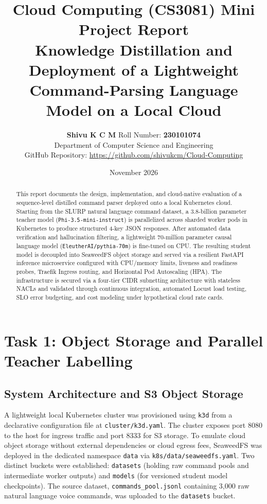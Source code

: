 \documentclass[10pt,a4paper]{article}
\title{\textbf{Cloud Computing (CS3081) Mini Project Report}\\
\large Knowledge Distillation and Deployment of a Lightweight Command-Parsing Language Model on a Local Cloud}
\author{\textbf{Shivu K C M} \quad Roll Number: \textbf{230101074}\\
Department of Computer Science and Engineering\\
GitHub Repository: \url{https://github.com/shivukcm/Cloud-Computing}}
\date{November 2026}
\begin{document}
\maketitle
\thispagestyle{fancy}

\begin{abstract}
This report documents the design, implementation, and cloud-native evaluation of a sequence-level distilled command parser deployed onto a local Kubernetes cloud. Starting from the SLURP natural language command dataset, a 3.8-billion parameter teacher model (\texttt{Phi-3.5-mini-instruct}) is parallelized across sharded worker pods in Kubernetes to produce structured 4-key JSON responses. After automated data verification and hallucination filtering, a lightweight 70-million parameter causal language model (\texttt{EleutherAI/pythia-70m}) is fine-tuned on CPU. The resulting student model is decoupled into SeaweedFS object storage and served via a resilient FastAPI inference microservice configured with CPU/memory limits, liveness and readiness probes, Traefik Ingress routing, and Horizontal Pod Autoscaling (HPA). The infrastructure is secured via a four-tier CIDR subnetting architecture with stateless NACLs and validated through continuous integration, automated Locust load testing, SLO error budgeting, and cost modeling under hypothetical cloud rate cards.
\end{abstract}

\vspace{-0.5em}
\section{Task 1: Object Storage and Parallel Teacher Labelling}
\subsection{System Architecture and S3 Object Storage}
A lightweight local Kubernetes cluster was provisioned using \texttt{k3d} from a declarative configuration file at \texttt{cluster/k3d.yaml}. The cluster exposes port 8080 to the host for ingress traffic and port 8333 for S3 storage. To emulate cloud object storage without external dependencies or cloud egress fees, SeaweedFS was deployed in the dedicated namespace \texttt{data} via \texttt{k8s/data/seaweedfs.yaml}. Two distinct buckets were established: \texttt{datasets} (holding raw command pools and intermediate worker outputs) and \texttt{models} (for versioned student model checkpoints). The source dataset, \texttt{commands\_pool.jsonl} containing 3,000 raw natural language voice commands, was uploaded to the \texttt{datasets} bucket.
\end{document}
